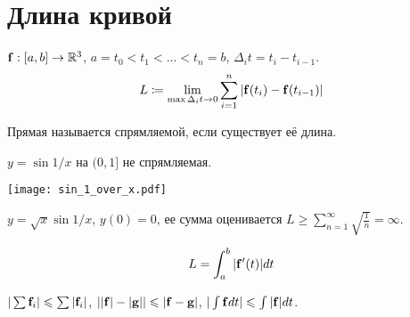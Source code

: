 \documentclass[main]{subfiles}
\begin{document}
\section{Длина кривой}
\begin{definition}
    $\mathbf{f}: [a,b] \to \mathbb{R}^3$, $a = t_0 < t_1 < ... < t_n = b$, $\Delta_i t = t_i - t_{i-1}$.
    \[L \coloneqq \lim_{\max \Delta_i t \to 0} \sum_{i=1}^n |\mathbf{f}(t_i) - \mathbf{f}(t_{i-1})|\]
\end{definition}

\begin{definition}
    Прямая называется спрямляемой, если существует её длина.
\end{definition}
\begin{example}
    $y = \sin 1/x$  на $(0, 1]$ не спрямляемая.
    \begin{center}
        \texttt{[image: sin\_1\_over\_x.pdf]}
    \end{center}
\end{example}
\begin{example}
    $y = \sqrt{x} \sin 1/x$, $y(0) = 0$, ее сумма оценивается $L \ge \sum_{n=1}^\infty \sqrt{\frac{1}{n}} = \infty$.
\end{example}
\begin{theorem}
    \[L = \int_a^b |\mathbf{f}'(t)| dt \]
\end{theorem}
\begin{remark}
    $|\sum \mathbf{f}_i| \leqslant \sum |\mathbf{f}_i|$, $||\mathbf{f}| - |\mathbf{g}|| \leqslant |\mathbf{f} - \mathbf{g}|$, $|\int \mathbf{f} dt| \leqslant \int |\mathbf{f}| dt$.
\end{remark}
\end{document}
